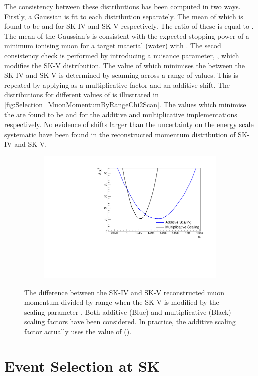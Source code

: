 The consistency between these distributions has been computed in two ways. Firstly, a Gaussian is fit to each distribution separately. The mean of which is found to be  and  for SK-IV and SK-V respectively. The ratio of these is equal to . The mean of the Gaussian's is consistent with the expected stopping power of a minimum ionising muon for a target material (water) with  \cite{PhysRevD.86.010001}. The secod consistency check is performed by introducing a nuisance parameter, \quickmath{\alpha}, which modifies the SK-V distribution. The value of \quickmath{\alpha} which minimises the  between the SK-IV and SK-V is determined by scanning across a range of values. This is repeated by applying \quickmath{\alpha} as a multiplicative factor and an additive shift. The  distributions for different values of \quickmath{\alpha} is illustrated in \autoref{fig:Selection_MuonMomentumByRangeChi2Scan}. The values which minimise the  are found to be  and  for the additive and multiplicative implementations respectively. No evidence of shifts larger than the  uncertainty on the energy scale systematic have been found in the reconstructed momentum distribution of SK-IV and SK-V.

\begin{figure}[h]
  \begin{subfigure}[t]{\textwidth}
    \includegraphics[width=\textwidth, trim={0mm 0mm 0mm 0mm}, clip, page=1]{Figures/Selections/MuonRange_Chi2Scan.pdf}
  \end{subfigure}
  \caption{The  difference between the SK-IV and SK-V reconstructed muon momentum divided by range when the SK-V is modified by the scaling parameter \quickmath{\alpha}. Both additive (Blue) and multiplicative (Black) scaling factors have been considered. In practice, the additive scaling factor actually uses the value of ().}
  \label{fig:Selection_MuonMomentumByRangeChi2Scan}
\end{figure}

\section{Event Selection at SK}
\label{sec:Selections_Selection}
